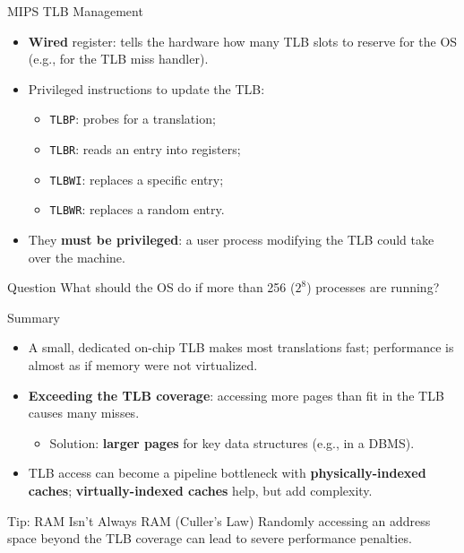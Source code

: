 \begin{frame}{MIPS TLB Management}

\begin{itemize}
    \item \textbf{Wired} register: tells the hardware how many TLB slots
          to reserve for the OS (e.g., for the TLB miss handler).
    \item Privileged instructions to update the TLB:
    \begin{itemize}
        \item \texttt{TLBP}: probes for a translation;
        \item \texttt{TLBR}: reads an entry into registers;
        \item \texttt{TLBWI}: replaces a specific entry;
        \item \texttt{TLBWR}: replaces a random entry.
    \end{itemize}
    \item They \textbf{must be privileged}: a user process modifying the TLB
          could take over the machine.
\end{itemize}

\begin{block}{Question}
What should the OS do if more than 256 ($2^8$) processes are running?
\end{block}

\end{frame}

\begin{frame}{Summary}

\begin{itemize}
    \item A small, dedicated on-chip TLB makes most translations fast;
          performance is almost as if memory were not virtualized.
    \item \textbf{Exceeding the TLB coverage}: accessing more pages than fit
          in the TLB causes many misses.
    \begin{itemize}
        \item Solution: \textbf{larger pages} for key data structures
              (e.g., in a DBMS).
    \end{itemize}
    \item TLB access can become a pipeline bottleneck with
          \textbf{physically-indexed caches};
          \textbf{virtually-indexed caches} help, but add complexity.
\end{itemize}

\begin{block}{Tip: RAM Isn't Always RAM (Culler's Law)}
Randomly accessing an address space beyond the TLB coverage can lead to
severe performance penalties.
\end{block}

\end{frame}

